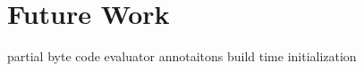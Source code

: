 
% 
% 
% 




\chapter{Future Work}

partial byte code evaluator
annotaitons
build time initialization